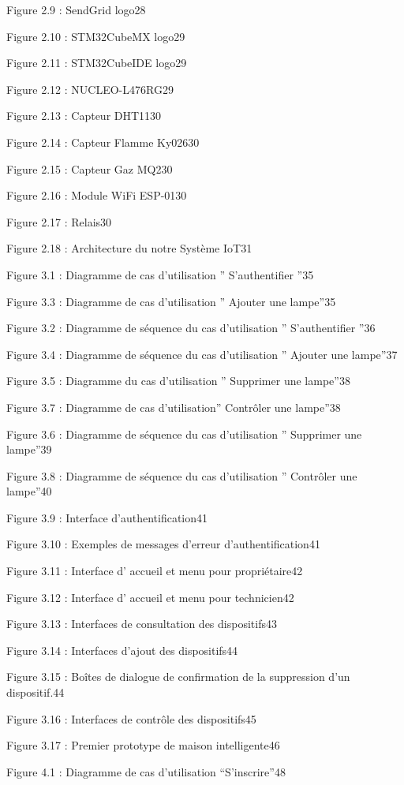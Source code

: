 \documentclass{article}
\begin{document}
Figure 2.9 : SendGrid logo28

Figure 2.10 : STM32CubeMX logo29

Figure 2.11 : STM32CubeIDE logo29

Figure 2.12 : NUCLEO-L476RG29

Figure 2.13 : Capteur DHT1130

Figure 2.14 : Capteur Flamme Ky02630

Figure 2.15 : Capteur Gaz MQ230

Figure 2.16 : Module WiFi ESP-0130

Figure 2.17 : Relais30

Figure 2.18 : Architecture du notre Système IoT31

Figure 3.1 : Diagramme de cas d’utilisation ” S’authentifier ”35

Figure 3.3 : Diagramme de cas d’utilisation ” Ajouter une lampe”35

Figure 3.2 : Diagramme de séquence du cas d’utilisation ” S’authentifier ”36

Figure 3.4 : Diagramme de séquence du cas d’utilisation ” Ajouter une lampe”37

Figure 3.5 : Diagramme du cas d’utilisation ” Supprimer une lampe”38

Figure 3.7 : Diagramme de cas d’utilisation” Contrôler une lampe”38

Figure 3.6 : Diagramme de séquence du cas d’utilisation ” Supprimer une lampe”39

Figure 3.8 : Diagramme de séquence du cas d’utilisation ” Contrôler une lampe”40

Figure 3.9 : Interface d’authentification41

Figure 3.10 : Exemples de messages d’erreur d’authentification41

Figure 3.11 : Interface d’ accueil et menu pour propriétaire42

Figure 3.12 : Interface d’ accueil et menu pour technicien42

Figure 3.13 : Interfaces de consultation des dispositifs43

Figure 3.14 : Interfaces d’ajout des dispositifs44

Figure 3.15 : Boîtes de dialogue de confirmation de la suppression d’un dispositif.44

Figure 3.16 : Interfaces de contrôle des dispositifs45

Figure 3.17 : Premier prototype de maison intelligente46

Figure 4.1 : Diagramme de cas d’utilisation “S’inscrire”48
\end{document}
